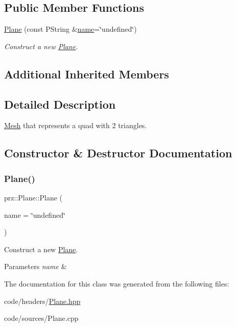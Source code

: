 \subsection*{Public Member Functions}
\begin{DoxyCompactItemize}
\item 
\mbox{\hyperlink{classprz_1_1_plane_ac31be057633bcd3055554915ead99b89}{Plane}} (const P\+String \&\mbox{\hyperlink{classprz_1_1_mesh_ae2a7cec3a1cb7409ea2017cd729fe683}{name}}=\char`\"{}undefined\char`\"{})
\begin{DoxyCompactList}\small\item\em Construct a new \mbox{\hyperlink{classprz_1_1_plane}{Plane}}. \end{DoxyCompactList}\end{DoxyCompactItemize}
\subsection*{Additional Inherited Members}


\subsection{Detailed Description}
\mbox{\hyperlink{classprz_1_1_mesh}{Mesh}} that represents a quad with 2 triangles. 



\subsection{Constructor \& Destructor Documentation}
\mbox{\label{classprz_1_1_plane_ac31be057633bcd3055554915ead99b89}} 
\subsubsection{\texorpdfstring{Plane()}{Plane()}}
{\footnotesize\ttfamily prz\+::\+Plane\+::\+Plane (\begin{DoxyParamCaption}\item[{const P\+String \&}]{name = {\ttfamily \char`\"{}undefined\char`\"{}} }\end{DoxyParamCaption})}



Construct a new \mbox{\hyperlink{classprz_1_1_plane}{Plane}}. 


\begin{DoxyParams}{Parameters}
{\em name} & \\
\hline
\end{DoxyParams}


The documentation for this class was generated from the following files\+:\begin{DoxyCompactItemize}
\item 
code/headers/\mbox{\hyperlink{_plane_8hpp}{Plane.\+hpp}}\item 
code/sources/Plane.\+cpp\end{DoxyCompactItemize}
